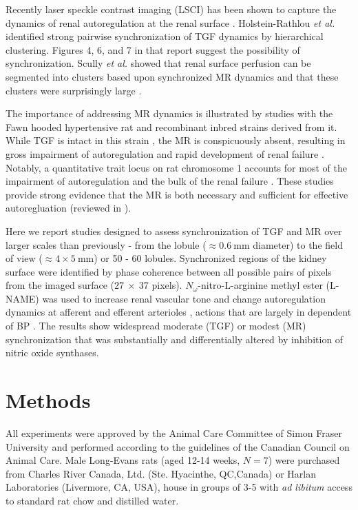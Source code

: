 	Recently laser speckle contrast imaging (LSCI) has been shown to capture the dynamics of renal autoregulation at the renal surface \cite{HolsteinRathlou11,Scully13,Scully14}. Holstein-Rathlou \emph{et al.} \cite{HolsteinRathlou11} identified strong pairwise synchronization of TGF dynamics by hierarchical clustering. Figures 4, 6, and 7 in that report suggest the possibility of synchronization. Scully \emph{et al.} showed that renal surface perfusion can be segmented into clusters based upon synchronized MR dynamics and that these clusters were surprisingly large \cite{Scully14}.
	
	The importance of addressing MR dynamics is illustrated by studies with the Fawn hooded hypertensive rat and recombinant inbred strains derived from it. While TGF is intact in this strain \cite{Verseput98}, the MR is conspicuously absent, resulting in gross impairment of autoregulation and rapid development of renal failure \cite{vanDokkum99a,vanDokkum99b,vanRodijnen02,Ochodnicky10}. Notably, a quantitative trait locus on rat chromosome 1 accounts for most of the impairment of autoregulation \cite{Lopez06} and the bulk of the renal failure \cite{Brown96}. These studies provide strong evidence that the MR is both necessary and sufficient for effective autoregluation (reviewed in \cite{Cupples07a,Cupples07b}).
	
	Here we report studies designed to assess synchronization of TGF and MR over larger scales than previously - from the lobule ($\approx 0.6 \ $mm diameter) to the field of view ($\approx 4 \times 5 \ $mm) or 50 - 60 lobules. Synchronized regions of the kidney surface were identified by phase coherence between all possible pairs of pixels from the imaged surface ($27 \ \times \ 37$ pixels). $N_\omega$-nitro-L-arginine methyl ester (L-NAME) was used to increase renal vascular tone and change autoregulation dynamics at afferent \cite{Wang99,Wang01} and efferent arterioles \cite{Sosnovtseva09}, actions that are largely in dependent of BP \cite{Shi06,Wang99,Wang01,Wang07}. The results show widespread moderate (TGF) or modest (MR) synchronization that was substantially and differentially altered by inhibition of nitric oxide synthases.


\section{Methods}

	All experiments were approved by the Animal Care Committee of Simon Fraser University and performed according to the guidelines of the Canadian Council on Animal Care. Male Long-Evans rats (aged 12-14 weeks, $N=7$) were purchased from Charles River Canada, Ltd. (Ste. Hyacinthe, QC,Canada) or Harlan Laboratories (Livermore, CA, USA), house in groups of 3-5 with \emph{ad libitum} access to standard rat chow and distilled water.
	
